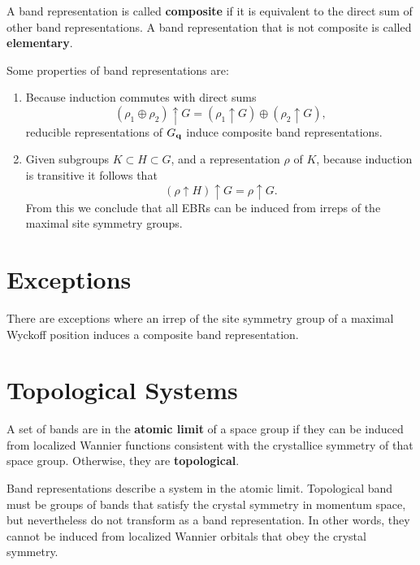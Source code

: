 \begin{definition}
A band representation is called \textbf{composite} if it is equivalent to the direct sum of other band representations. A band representation that is not composite is called \textbf{elementary}.
\end{definition}

\begin{theorem}
Some properties of band representations are:
\begin{enumerate}
\item Because induction commutes with direct sums
$$
(\rho_1 \oplus \rho_2) \uparrow G = (\rho_1 \uparrow G) \oplus (\rho_2 \uparrow G),
$$
reducible representations of $G_{\vb{q}}$ induce composite band representations.

\item Given subgroups $K \subset H \subset G$, and a representation $\rho$ of $K$, because induction is transitive it follows that
$$
(\rho \uparrow H) \uparrow G = \rho \uparrow G.
$$
From this we conclude that all EBRs can be induced from irreps of the maximal site symmetry groups.
\end{enumerate}
\end{theorem}

\section{Exceptions}

There are exceptions where an irrep of the site symmetry group of a maximal Wyckoff position induces a composite band representation.

\section{Topological Systems}

\begin{definition}
A set of bands are in the \textbf{atomic limit} of a space group if they can be induced from localized Wannier functions consistent with the crystallice symmetry of that space group. Otherwise, they are \textbf{topological}.
\end{definition}

Band representations describe a system in the atomic limit. Topological band must be groups of bands that satisfy the crystal symmetry in momentum space, but nevertheless do not transform as a band representation. In other words, they cannot be induced from localized Wannier orbitals that obey the crystal symmetry.

